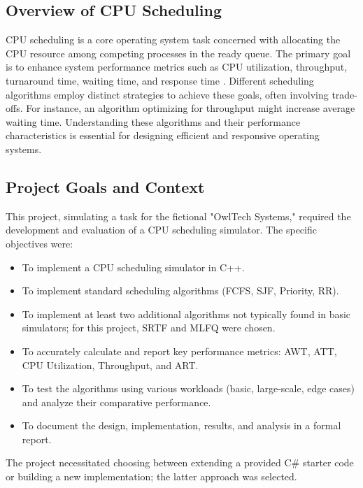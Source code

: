 \documentclass[12pt]{article}
\begin{document}
\subsection{Overview of CPU Scheduling}
CPU scheduling is a core operating system task concerned with allocating the CPU resource among competing processes in the ready queue. The primary goal is to enhance system performance metrics such as CPU utilization, throughput, turnaround time, waiting time, and response time \citep{silberschatz2018operating}. Different scheduling algorithms employ distinct strategies to achieve these goals, often involving trade-offs. For instance, an algorithm optimizing for throughput might increase average waiting time. Understanding these algorithms and their performance characteristics is essential for designing efficient and responsive operating systems.

\subsection{Project Goals and Context}
This project, simulating a task for the fictional "OwlTech Systems," required the development and evaluation of a CPU scheduling simulator. The specific objectives were:
\begin{itemize}
    \item To implement a CPU scheduling simulator in C++.
    \item To implement standard scheduling algorithms (FCFS, SJF, Priority, RR).
    \item To implement at least two additional algorithms not typically found in basic simulators; for this project, SRTF and MLFQ were chosen.
    \item To accurately calculate and report key performance metrics: AWT, ATT, CPU Utilization, Throughput, and ART.
    \item To test the algorithms using various workloads (basic, large-scale, edge cases) and analyze their comparative performance.
    \item To document the design, implementation, results, and analysis in a formal report.
\end{itemize}
The project necessitated choosing between extending a provided C# starter code or building a new implementation; the latter approach was selected.
\end{document}
